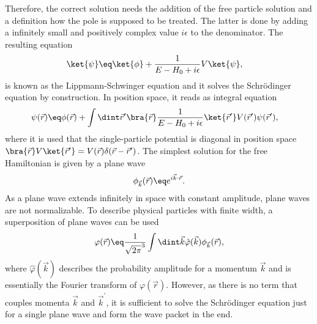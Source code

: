 \documentclass[\main/dresen_thesis.tex]{subfiles}
\begin{document}
Therefore, the correct solution needs the addition of the free particle solution and a definition how the pole is supposed to be treated. 
The latter is done by adding a infinitely small and positively complex value $i\epsilon$ to the denominator. The resulting equation
\begin{align}
  \ket{\psi} &\eq \ket{\phi} +  \frac{1}{E - H_0 + i \epsilon} V \ket{\psi},
\end{align}
is known as the Lippmann-Schwinger equation and  it solves the Schr\"odinger equation by construction. 
In position space, it reads as integral equation
\begin{align}
  \psi (\vec{r}) &\eq \phi(\vec{r}) + \int \dint \vec{r}^\prime \bra{\vec{r}}\frac{1}{E - H_0 + i \epsilon} \ket{\vec{r}^\prime} V (\vec{r}^\prime)\psi (\vec{r}^\prime),
  \label{eq:theoreticalBackground:scattering:scatteringTheory:LippmanSchwingerIntegralEquation}
\end{align}
where it is used that the single-particle potential is diagonal in position space $\bra{\vec{r}} V \ket{\vec{r}^\prime} = V(\vec{r}) \delta(\vec{r} - \vec{r}^\prime)$. 
The simplest solution for the free Hamiltonian is given by a plane wave
\begin{align}
  \phi_{\vec{k}}(\vec{r}) \eq e^{i\vec{k} \cdot \vec{r}}.
\end{align}
As a plane wave extends infinitely in space with constant amplitude, plane waves are not normalizable.
To describe physical particles with finite width, a superposition of plane waves can be used
\begin{align}
  \varphi(\vec{r}) \eq \frac{1}{\sqrt{2 \pi}^3} \int \dint \vec{k} \hat{\varphi} (\vec{k}) \phi_{\vec{k}}(\vec{r}),
\end{align}
where $\hat{\varphi} (\vec{k})$ describes the probability amplitude for a momentum $\vec{k}$ and is essentially the Fourier transform of $\varphi(\vec{r})$. 
However, as there is no term that couples momenta $\vec{k}$ and $\vec{k}^\prime$, it is sufficient to solve the Schr\"odinger equation just for a single plane wave and form the wave packet in the end.
\end{document}
